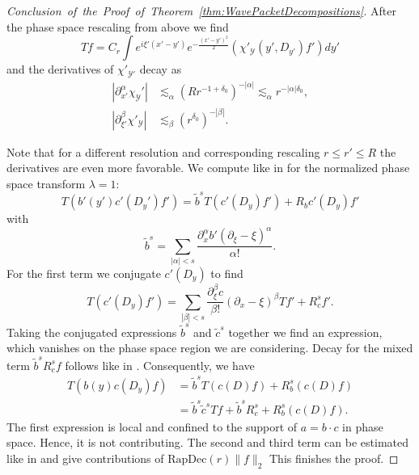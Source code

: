 \documentclass{amsart}
\theoremstyle{definition}
\begin{document}
\begin{proof}[Conclusion~of~the~Proof~of~Theorem~\ref{thm:WavePacketDecompositions}]
    After the phase space rescaling from above we find
    \begin{equation*}
        T f = C_r \int e^{i \xi'(x'-y')} e^{-\frac{(x'-y')^2}{2}} (\chi'_{\mathcal{Y}}(y',D_{y'}) f') dy'
    \end{equation*}
    and the derivatives of $\chi'_{\mathcal{Y}'}$ decay as
    \begin{equation}
    \label{eq:}
        \begin{split}
            |\partial_{x'}^{\alpha} \chi_{\mathcal{Y}}'| &\lesssim_{\alpha} (R r^{-1+\delta_0})^{-|\alpha|} \lesssim_{\alpha} r^{-|\alpha| \delta_0}, \\
            |\partial_{\xi'}^{\beta} \chi'_{\mathcal{Y}}| &\lesssim_{\beta} (r^{\delta_0})^{-|\beta|}.
        \end{split}
    \end{equation}

    Note that for a different resolution and corresponding rescaling $r \leq r' \leq R$ the derivatives are even more favorable. We compute like in \cite[p.~355]{Tataru2000} for the normalized phase space transform $\lambda = 1$:
    \begin{equation*}
        T(b'(y') c'(D_y') f') = \tilde{b}^s T(c'(D_y) f') + R_b c'(D_y) f'
    \end{equation*}
    with
    \begin{equation*}
        \tilde{b}^s = \sum_{|\alpha| < s} \frac{\partial_x^{\alpha} b' (\partial_{\xi} - \xi)^{\alpha}}{\alpha!}.
    \end{equation*}
    For the first term we conjugate $c'(D_y)$ to find
    \begin{equation*}
        T(c'(D_y) f') = \sum_{|\beta| < s} \frac{\partial_{\xi}^{\beta} c}{\beta!} (\partial_x - \xi)^{\beta} Tf' + R^s_c f'.      
    \end{equation*}
    Taking the conjugated expressions $\tilde{b}^s$ and $\tilde{c}^s$ together we find an expression, which vanishes on the phase space region we are considering.
    Decay for the mixed term $\tilde{b}^s R^s_c f$ follows like in \cite[Eq.~(2.10)]{Tataru2000}. Consequently, we have
    \begin{equation*}
    \begin{split}
        T(b(y) c(D_y) f) &= \tilde{b}^s T(c(D) f) + R^s_b (c(D) f) \\
        &= \tilde{b}^s \tilde{c}^s Tf + \tilde{b}^s R^s_c + R^s_b (c(D) f).
        \end{split}
    \end{equation*}
    The first expression is local and confined to the support of $a =b \cdot c$ in phase space. Hence, it is not contributing. The second and third term can be estimated like in \cite{Tataru2000} and give contributions of $\text{RapDec}(r) \| f \|_2$
    This finishes the proof.
\end{proof}
\end{document}
